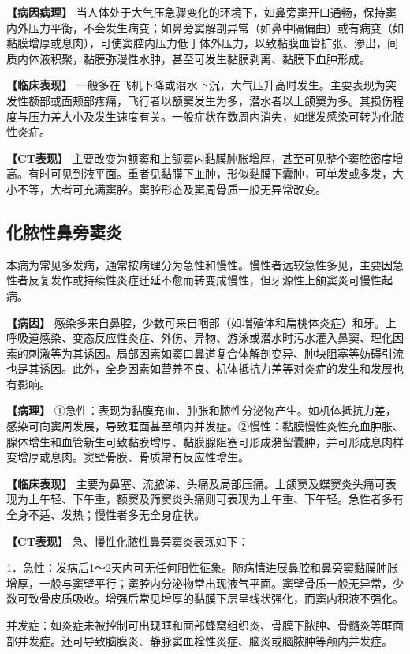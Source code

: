 \textbf{【病因病理】}
当人体处于大气压急骤变化的环境下，如鼻旁窦开口通畅，保持窦内外压力平衡，不会发生病变；如鼻旁窦解剖异常（如鼻中隔偏曲）或有病变（如黏膜增厚或息肉），可使窦腔内压力低于体外压力，以致黏膜血管扩张、渗出，间质内体液积聚，黏膜弥漫性水肿，甚至可发生黏膜剥离、黏膜下血肿形成。

\textbf{【临床表现】}
一般多在飞机下降或潜水下沉，大气压升高时发生。主要表现为突发性额部或面颊部疼痛，飞行者以额窦发生为多，潜水者以上颌窦为多。其损伤程度与压力差大小及发生速度有关。一般症状在数周内消失，如继发感染可转为化脓性炎症。

\textbf{【CT表现】}
主要改变为额窦和上颌窦内黏膜肿胀增厚，甚至可见整个窦腔密度增高。有时可见到液平面。重者见黏膜下血肿，形似黏膜下囊肿，可单发或多发，大小不等，大者可充满窦腔。窦腔形态及窦周骨质一般无异常改变。

\subsection{化脓性鼻旁窦炎}

本病为常见多发病，通常按病理分为急性和慢性。慢性者远较急性多见，主要因急性者反复发作或持续性炎症迁延不愈而转变成慢性，但牙源性上颌窦炎可慢性起病。

\textbf{【病因】}
感染多来自鼻腔，少数可来自咽部（如增殖体和扁桃体炎症）和牙。上呼吸道感染、变态反应性炎症、外伤、异物、游泳或潜水时污水灌入鼻窦、理化因素的刺激等为其诱因。局部因素如窦口鼻道复合体解剖变异、肿块阻塞等妨碍引流也是其诱因。此外，全身因素如营养不良、机体抵抗力差等对炎症的发生和发展也有影响。

\textbf{【病理】}
①急性：表现为黏膜充血、肿胀和脓性分泌物产生。如机体抵抗力差，感染可向窦周发展，导致眶面甚至颅内并发症。②慢性：黏膜慢性炎性充血肿胀、腺体增生和血管新生可致黏膜增厚、黏膜腺阻塞可形成潴留囊肿，并可形成息肉样变增厚或息肉。窦壁骨膜、骨质常有反应性增生。

\textbf{【临床表现】}
主要为鼻塞、流脓涕、头痛及局部压痛。上颌窦及蝶窦炎头痛可表现为上午轻、下午重，额窦及筛窦炎头痛则可表现为上午重、下午轻。急性者多有全身不适、发热；慢性者多无全身症状。

\textbf{【CT表现】} 急、慢性化脓性鼻旁窦炎表现如下：

1．急性：发病后1～2天内可无任何阳性征象。随病情进展鼻腔和鼻旁窦黏膜肿胀增厚，一般与窦壁平行；窦腔内分泌物常出现液气平面。窦壁骨质一般无异常，少数可致骨皮质吸收。增强后常见增厚的黏膜下层呈线状强化，而窦内积液不强化。

并发症：如炎症未被控制可出现眶和面部蜂窝组织炎、骨膜下脓肿、骨髓炎等眶面部并发症。还可导致脑膜炎、静脉窦血栓性炎症、脑炎或脑脓肿等颅内并发症。

